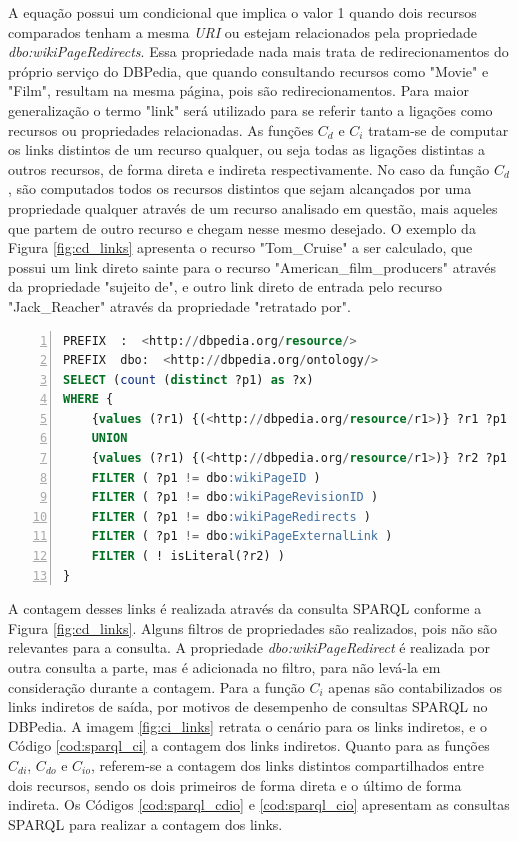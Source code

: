 A equação possui um condicional que implica o valor 1 quando dois recursos comparados tenham a mesma \textit{URI} ou estejam relacionados pela propriedade \textit{dbo:wikiPageRedirects}. Essa propriedade nada mais trata de redirecionamentos do próprio serviço do DBPedia, que quando consultando recursos como "Movie" e "Film", resultam na mesma página, pois são redirecionamentos. Para maior generalização o termo "link" será utilizado para se referir tanto a ligações como recursos ou propriedades relacionadas. As funções $C_d$ e $C_i$ tratam-se de computar os links distintos de um recurso qualquer, ou seja todas as ligações distintas a outros recursos, de forma direta e indireta respectivamente. No caso da função $C_d$, são computados todos os recursos distintos que sejam alcançados por uma propriedade qualquer através de um recurso analisado em questão, mais aqueles que partem de outro recurso e chegam nesse mesmo desejado. O exemplo da Figura \ref{fig:cd_links} apresenta o recurso "Tom\_Cruise" a ser calculado, que possui um link direto sainte para o recurso "American\_film\_producers" através da propriedade "sujeito de", e outro link direto de entrada pelo recurso "Jack\_Reacher" através da propriedade "retratado por".

\begin{lstlisting}[caption=Consulta SPARQL para contagem de links diretos, language=SQL, frame=single, label={cod:sparql_cd}, float, numbers=left]
PREFIX  :  <http://dbpedia.org/resource/>
PREFIX  dbo:  <http://dbpedia.org/ontology/>
SELECT (count (distinct ?p1) as ?x)
WHERE {
	{values (?r1) {(<http://dbpedia.org/resource/r1>)} ?r1 ?p1 ?r2 . FILTER (?r1 != ?r2)}
	UNION
	{values (?r1) {(<http://dbpedia.org/resource/r1>)} ?r2 ?p1 ?r1 . FILTER (?r1 != ?r2)}
	FILTER ( ?p1 != dbo:wikiPageID )
	FILTER ( ?p1 != dbo:wikiPageRevisionID )
	FILTER ( ?p1 != dbo:wikiPageRedirects )
	FILTER ( ?p1 != dbo:wikiPageExternalLink )
	FILTER ( ! isLiteral(?r2) )
}
\end{lstlisting}

A contagem desses links é realizada através da consulta \ac{SPARQL} conforme a Figura \ref{fig:cd_links}. Alguns filtros de propriedades são realizados, pois não são relevantes para a consulta. A propriedade \textit{dbo:wikiPageRedirect} é realizada por outra consulta a parte, mas é adicionada no filtro, para não levá-la em consideração durante a contagem. Para a função $C_i$ apenas são contabilizados os links indiretos de saída, por motivos de desempenho de consultas SPARQL no DBPedia. A imagem \ref{fig:ci_links} retrata o cenário para os links indiretos, e o Código \ref{cod:sparql_ci} a contagem dos links indiretos. Quanto para as funções $C_{di}$, $C_{do}$ e $C_{io}$, referem-se a contagem dos links distintos compartilhados entre dois recursos, sendo os dois primeiros de forma direta e o último de forma indireta. Os Códigos \ref{cod:sparql_cdio} e \ref{cod:sparql_cio} apresentam as consultas \ac{SPARQL} para realizar a contagem dos links.

